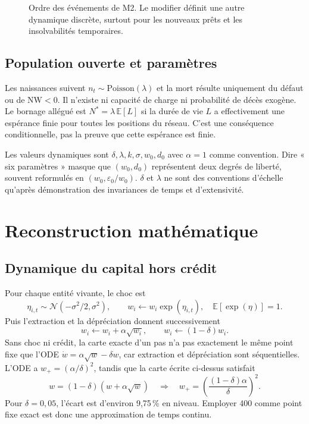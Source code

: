 \documentclass[11pt,a4paper]{article}
\newcommand{\NW}{\mathrm{NW}}
\begin{document}
\begin{figure}[ht]
\centering
{}
\caption{Ordre des événements de M2. Le modifier définit une autre dynamique
discrète, surtout pour les nouveaux prêts et les insolvabilités temporaires.}
\end{figure}

\subsection{Population ouverte et paramètres}

Les naissances suivent $n_t\sim\mathrm{Poisson}(\lambda)$ et la mort résulte
uniquement du défaut ou de $\NW<0$. Il n'existe ni capacité de charge ni probabilité
de décès exogène. Le bornage allégué est $N^*=\lambda\,\mathbb{E}[L]$ si la durée
de vie $L$ a effectivement une espérance finie pour toutes les positions du
réseau. C'est une conséquence conditionnelle, pas la preuve que cette espérance
est finie.

Les valeurs dynamiques sont $\delta,\lambda,k,\sigma,w_0,d_0$ avec $\alpha=1$
comme convention. Dire « six paramètres » masque que $(w_0,d_0)$ représentent
deux degrés de liberté, souvent reformulés en $(w_0,\varepsilon_0/w_0)$.
$\delta$ et $\lambda$ ne sont des conventions d'échelle qu'après démonstration
des invariances de temps et d'extensivité.

\section{Reconstruction mathématique}

\subsection{Dynamique du capital hors crédit}

Pour chaque entité vivante, le choc est
\[
 \eta_{i,t}\sim\mathcal N(-\sigma^2/2,\sigma^2),\qquad
 w_i\leftarrow w_i\exp(\eta_{i,t}),
 \quad\mathbb E[\exp(\eta)]=1.
\]
Puis l'extraction et la dépréciation donnent successivement
\[
 w_i\leftarrow w_i+\alpha\sqrt{w_i},\qquad
 w_i\leftarrow(1-\delta)w_i.
\]
Sans choc ni crédit, la carte exacte d'un pas n'a pas exactement le même point
fixe que l'ODE $\dot w=\alpha\sqrt w-\delta w$, car extraction et dépréciation
sont séquentielles. L'ODE a $w_+=(\alpha/\delta)^2$, tandis que la carte écrite
ci-dessus satisfait
\[
 w=(1-\delta)(w+\alpha\sqrt w)
 \quad\Longrightarrow\quad
 w_+=\left(\frac{(1-\delta)\alpha}{\delta}\right)^2.
\]
Pour $\delta=0{,}05$, l'écart est d'environ 9,75\,\% en niveau. Employer 400
comme point fixe exact est donc une approximation de temps continu.
\end{document}
